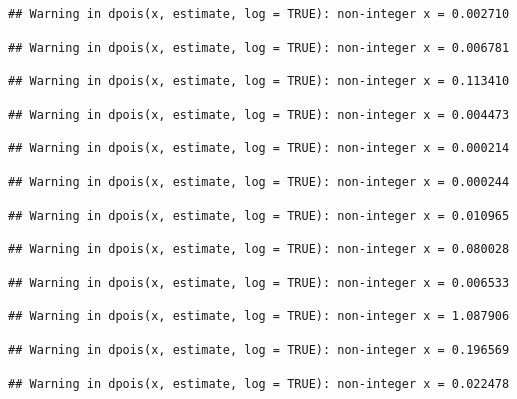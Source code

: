 \documentclass[]{article}
\begin{document}
\begin{verbatim}
## Warning in dpois(x, estimate, log = TRUE): non-integer x = 0.002710
\end{verbatim}

\begin{verbatim}
## Warning in dpois(x, estimate, log = TRUE): non-integer x = 0.006781
\end{verbatim}

\begin{verbatim}
## Warning in dpois(x, estimate, log = TRUE): non-integer x = 0.113410
\end{verbatim}

\begin{verbatim}
## Warning in dpois(x, estimate, log = TRUE): non-integer x = 0.004473
\end{verbatim}

\begin{verbatim}
## Warning in dpois(x, estimate, log = TRUE): non-integer x = 0.000214
\end{verbatim}

\begin{verbatim}
## Warning in dpois(x, estimate, log = TRUE): non-integer x = 0.000244
\end{verbatim}

\begin{verbatim}
## Warning in dpois(x, estimate, log = TRUE): non-integer x = 0.010965
\end{verbatim}

\begin{verbatim}
## Warning in dpois(x, estimate, log = TRUE): non-integer x = 0.080028
\end{verbatim}

\begin{verbatim}
## Warning in dpois(x, estimate, log = TRUE): non-integer x = 0.006533
\end{verbatim}

\begin{verbatim}
## Warning in dpois(x, estimate, log = TRUE): non-integer x = 1.087906
\end{verbatim}

\begin{verbatim}
## Warning in dpois(x, estimate, log = TRUE): non-integer x = 0.196569
\end{verbatim}

\begin{verbatim}
## Warning in dpois(x, estimate, log = TRUE): non-integer x = 0.022478
\end{verbatim}
\end{document}
